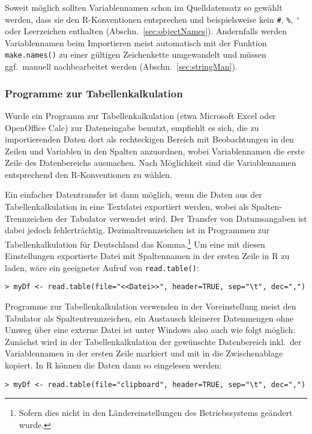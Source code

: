 Soweit möglich sollten Variablennamen schon im Quelldatensatz so gewählt werden, dass sie den R-Konventionen entsprechen und beispielsweise kein \lstinline!#!, \lstinline!%!, \lstinline!'! oder Leerzeichen enthalten (Abschn.\ \ref{sec:objectNames}). Andernfalls werden Variablennamen beim Importieren meist automatisch mit der Funktion \lstinline!make.names()! zu einer gültigen Zeichenkette umgewandelt und müssen ggf.\ manuell nachbearbeitet werden (Abschn.\ \ref{sec:stringMan}).

\subsubsection{Programme zur Tabellenkalkulation}

Wurde ein Programm zur Tabellenkalkulation (etwa Microsoft Excel oder OpenOffice Calc) zur Dateneingabe benutzt, empfiehlt es sich, die zu importierenden Daten dort als rechteckigen Bereich mit Beobachtungen in den Zeilen und Variablen in den Spalten anzuordnen, wobei Variablennamen die erste Zeile des Datenbereichs ausmachen. Nach Möglichkeit sind die Variablennamen entsprechend den R-Konventionen zu wählen.

Ein einfacher Datentransfer ist dann möglich, wenn die Daten aus der Tabellenkalkulation in eine Textdatei exportiert werden, wobei als Spalten-Trennzeichen der Tabulator verwendet wird. Der Transfer von Datumsangaben ist dabei jedoch fehlerträchtig. Dezimaltrennzeichen ist in Programmen zur Tabellenkalkulation für Deutschland das Komma.\footnote{Sofern dies nicht in den Ländereinstellungen des Betriebssystems geändert wurde.} Um eine mit diesen Einstellungen exportierte Datei mit Spaltennamen in der ersten Zeile in R zu laden, wäre ein geeigneter Aufruf von \lstinline!read.table()!:
\begin{lstlisting}
> myDf <- read.table(file="<<Datei>>", header=TRUE, sep="\t", dec=",")
\end{lstlisting}

Programme zur Tabellenkalkulation verwenden in der Voreinstellung meist den Tabulator als Spaltentrennzeichen, ein Austausch kleinerer Datenmengen ohne Umweg über eine externe Datei ist unter Windows also auch wie folgt möglich: Zunächst wird in der Tabellenkalkulation der gewünschte Datenbereich inkl.\ der Variablennamen in der ersten Zeile markiert und mit  in die Zwischenablage kopiert. In R können die Daten dann so eingelesen werden:
\begin{lstlisting}
> myDf <- read.table(file="clipboard", header=TRUE, sep="\t", dec=",")
\end{lstlisting}

